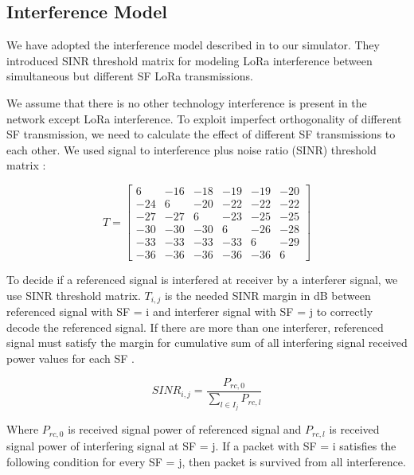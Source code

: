 \documentclass[conference]{IEEEtran}
\begin{document}
\subsection{Interference Model}
\par We have adopted the interference model described in \cite{7996384} to our simulator. They introduced SINR threshold matrix for modeling LoRa interference between simultaneous but different SF LoRa transmissions.

\par We assume that there is no other technology interference is present in the network except LoRa interference. To exploit imperfect orthogonality of different SF transmission, we need to calculate the effect of different SF transmissions to each other. We used signal to interference plus noise ratio (SINR) threshold matrix \cite{goursaud:hal-01231221}:

\begin{equation} \label{eq:sinr}
T = \begin{bmatrix}
       6 & -16 & -18 & -19 & -19 & -20 \\
     -24 &   6 & -20 & -22 & -22 & -22 \\
     -27 & -27 &   6 & -23 & -25 & -25 \\
     -30 & -30 & -30 &   6 & -26 & -28 \\
     -33 & -33 & -33 & -33 &   6 & -29 \\
     -36 & -36 & -36 & -36 & -36 &   6
     \end{bmatrix}
\end{equation}

\par To decide if a referenced signal is interfered at receiver by a interferer signal, we use SINR threshold matrix. $T_{i,j}$ is the needed SINR margin in dB between referenced signal with SF = i and interferer signal with SF = j to correctly decode the referenced signal. If there are more than one interferer, referenced signal must satisfy the margin for cumulative sum of all interfering signal received power values for each SF \cite{7996384}.

\begin{equation} \label{eq:sinr_db}
SINR_{i,j} = \dfrac{P_{rc,0}}{\sum_{l \in I_j} P_{rc,l}}
\end{equation}

\par Where $P_{rc,0}$ is received signal power of referenced signal and $P_{rc,l}$ is received signal power of interfering signal at SF = j. If a packet with SF = i satisfies the following condition for every SF = j, then packet is survived from all interference.
\end{document}
